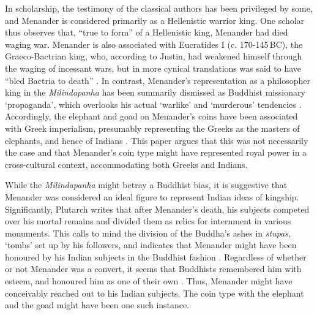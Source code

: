 \documentclass{ijsra}
\renewcommand\BC{{\,BC\xspace}}
\begin{document}
In scholarship, the testimony of the classical authors has been privileged by some, and Menander is considered primarily as a Hellenistic warrior king.
One scholar thus observes that, “true to form” of a Hellenistic king, Menander had died waging war.
Menander is also associated with Eucratides I (c. 170-145\BC),
the Graeco-Bactrian king, who, according to Justin,
had weakened himself through the waging of incessant wars,
but in more cynical translations was said to have “bled Bactria to death”
.
In contrast, Menander’s representation as a philosopher king in the \emph{Milindapanha} has been summarily dismissed as Buddhist missionary ‘propaganda’, which overlooks his actual ‘warlike’ and ‘murderous’ tendencies \parencites[234]{Widemann2000}[15--16]{Widemann2007}.
Accordingly, the elephant and goad on Menander’s coins have been associated with Greek imperialism, presumably representing the Greeks as the masters of elephants, and hence of Indians \parencite[87--89]{Fussman1993}.
This paper argues that this was not necessarily the case and that Menander’s coin type might have represented royal power in a cross-cultural context, accommodating both Greeks and Indians.

While the \emph{Milindapanha} might betray a Buddhist bias, it is suggestive that Menander was considered an ideal figure to represent Indian ideas of kingship.
Significantly, Plutarch writes that after Menander’s death, his subjects competed over his mortal remains and divided them as relics for internment in various monuments.
This calls to mind the division of the Buddha’s ashes in \emph{stupas}, ‘tombs’ set up by his followers, and indicates that Menander might have been honoured by his Indian subjects in the Buddhist fashion .
Regardless of whether or not Menander was a convert, it seems that Buddhists remembered him with esteem, and honoured him as one of their own \parencite[644]{Mairs2015}.
Thus, Menander might have conceivably reached out to his Indian subjects. The coin type with the elephant and the goad might have been one such instance.
\end{document}
